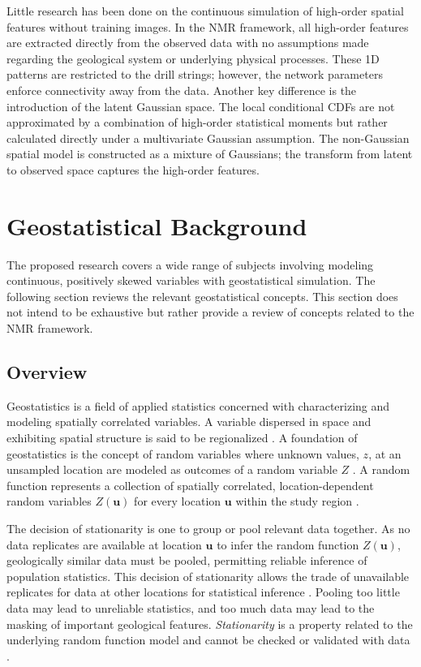 Little research has been done on the continuous simulation of high-order spatial features without training images. In the \gls{NMR} framework, all high-order features are extracted directly from the observed data with no assumptions made regarding the geological system or underlying physical processes. These \gls{1D} patterns are restricted to the drill strings; however, the network parameters enforce connectivity away from the data. Another key difference is the introduction of the latent Gaussian space. The local conditional \glspl{CDF} are not approximated by a combination of high-order statistical moments but rather calculated directly under a multivariate Gaussian assumption. The non-Gaussian spatial model is constructed as a mixture of Gaussians; the transform from latent to observed space captures the high-order features.


\FloatBarrier
\section{Geostatistical Background}
\label{sec:01geostatreview}

The proposed research covers a wide range of subjects involving modeling continuous, positively skewed variables with geostatistical simulation. The following section reviews the relevant geostatistical concepts. This section does not intend to be exhaustive but rather provide a review of concepts related to the \gls{NMR} framework.

\FloatBarrier
\subsection{Overview}
\label{subsec:01overview}

Geostatistics is a field of applied statistics concerned with characterizing and modeling spatially correlated variables. A variable dispersed in space and exhibiting spatial structure is said to be regionalized \citep{matheron2019matheron}. A foundation of geostatistics is the concept of random variables where unknown values, $z$, at an unsampled location are modeled as outcomes of a random variable $Z$ \citep{deutsch1992geostatistical}. A random function represents a collection of spatially correlated, location-dependent random variables $Z(\mathbf{u})$ for every location $\mathbf{u}$ within the study region \citep{goovaerts1997geostatistics}.

The decision of stationarity is one to group or pool relevant data together. As no data replicates are available at location $\mathbf{u}$ to infer the random function $Z(\mathbf{u})$, geologically similar data must be pooled, permitting reliable inference of population statistics. This decision of stationarity allows the trade of unavailable replicates for data at other locations for statistical inference \citep{deutsch1992geostatistical}. Pooling too little data may lead to unreliable statistics, and too much data may lead to the masking of important geological features. \textit{Stationarity} is a property related to the underlying random function model and cannot be checked or validated with data \citep{goovaerts1997geostatistics}.

